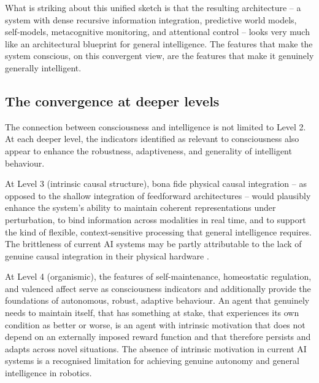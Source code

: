 \documentclass[11pt, a4paper, onecolumn, gdm]{google}
\begin{document}
What is striking about this unified sketch is that the resulting architecture -- a system with dense recursive information integration, predictive world models, self-models, metacognitive monitoring, and attentional control -- looks very much like an architectural blueprint for general intelligence.
The features that make the system conscious, on this convergent view, are the features that make it genuinely generally intelligent.

\subsection{The convergence at deeper levels}\label{the-convergence-at-deeper-levels}

The connection between consciousness and intelligence is not limited to Level 2.
At each deeper level, the indicators identified as relevant to consciousness also appear to enhance the robustness, adaptiveness, and generality of intelligent behaviour.

At Level 3 (intrinsic causal structure), bona fide physical causal integration -- as opposed to the shallow integration of feedforward architectures -- would plausibly enhance the system's ability to maintain coherent representations under perturbation, to bind information across modalities in real time, and to support the kind of flexible, context-sensitive processing that general intelligence requires.
The brittleness of current AI systems may be partly attributable to the lack of genuine causal integration in their physical hardware \citep{bennett2024}.

At Level 4 (organismic), the features of self-maintenance, homeostatic regulation, and valenced affect serve as consciousness indicators and additionally provide the foundations of autonomous, robust, adaptive behaviour.
An agent that genuinely needs to maintain itself, that has something at stake, that experiences its own condition as better or worse, is an agent with intrinsic motivation that does not depend on an externally imposed reward function and that therefore persists and adapts across novel situations.
The absence of intrinsic motivation in current AI systems is a recognised limitation for achieving genuine autonomy and general intelligence in robotics.
\end{document}
